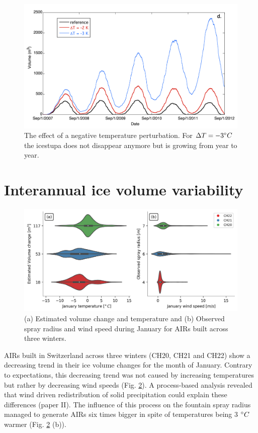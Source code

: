 \begin{figure}
	\centering
	\includegraphics[width=\textwidth]{figs/PIR_evolution.png}
	\caption{The effect of a negative temperature perturbation. For $\Delta T = -3 ^{\circ} C$ the icestupa does
		not disappear anymore but is growing from year to year.}
	\label{fig:PIR_evolution}
\end{figure}


\section{Interannual ice volume variability}
\label{sec:interannual}

\begin{figure}
	\centering
	\includegraphics[width=\textwidth]{figs/CH_diffs.jpg}
	\caption{(a) Estimated volume change and temperature and (b) Observed spray radius and wind speed
		during January for \ac{AIRs} built across three winters. }
	\label{fig:CH_diffs}
\end{figure}

\ac{AIRs} built in Switzerland across three winters (CH20, CH21 and CH22) show a decreasing trend in their ice volume
changes for the month of January. Contrary to expectations, this decreasing trend was not caused by increasing
temperatures but rather by decreasing wind speeds (Fig. \ref{fig:CH_diffs}). A process-based analysis revealed
that wind driven redistribution of solid precipitation could explain these differences (paper II). The influence of this process on
the fountain spray radius managed to generate \ac{AIRs} six times bigger in spite of temperatures being 3 $^{\circ} C$
warmer (Fig. \ref{fig:CH_diffs} (b)).



